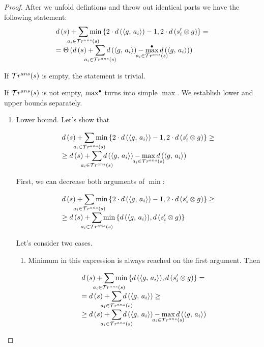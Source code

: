 \begin{proof}
After we unfold defintions and throw out identical parts we have the following statement:
\[ \begin{array}{l}
d\,(s) + \smashoperator[lr]{\sum\limits_{a_i \in \tra{s}}} \min\,\{2\cdot d\,(\taskst{g}{a_i}) - 1, 2\cdot d\,(s'_i \otimes g)\}  = \\
= \Theta\,(d\,(s) + \smashoperator[lr]{\sum\limits_{a_i \in \tra{s}}} d\,(\taskst{g}{a_i}) - \smashoperator{\maxd\limits_{a_i \in \tra{s}}} d\,(\taskst{g}{a_i})) \\
\end{array} \]

If $\mathcal{T}r^{ans}(s)$ is empty, the statement is trivial.

If $\mathcal{T}r^{ans}(s)$ is not empty, $\max^{\bullet}$ turns into simple $\max$. We establish lower and upper bounds separately.

\begin{enumerate}
  \item
  Lower bound. Let's show that 
  
  \[ \begin{array}{l}
  d\,(s) + \smashoperator[lr]{\sum\limits_{a_i \in \tra{s}}} \min\,\{2\cdot d\,(\taskst{g}{a_i}) - 1, 2\cdot d\,(s'_i \otimes g)\}  \ge \\
  \ge d\,(s) + \smashoperator[lr]{\sum\limits_{a_i \in \tra{s}}} d\,(\taskst{g}{a_i}) - \smashoperator{\max\limits_{a_i \in \tra{s}}} d\,(\taskst{g}{a_i}) \\
  \end{array} \]

  First, we can decrease both arguments of $\min$:

  \[ \begin{array}{l}
  d\,(s) + \smashoperator[lr]{\sum\limits_{a_i \in \tra{s}}} \min\,\{2\cdot d\,(\taskst{g}{a_i}) - 1, 2\cdot d\,(s'_i \otimes g)\}  \ge \\
  \ge d\,(s) + \smashoperator[lr]{\sum\limits_{a_i \in \tra{s}}} \min\,\{ d\,(\taskst{g}{a_i}), d\,(s'_i \otimes g)\} \\
  \end{array} \]

  Let's consider two cases.

  \begin{enumerate}
    \item Minimum in this expression is always reached on the first argument. Then
    
    \[ \begin{array}{l}
        d\,(s) + \smashoperator[lr]{\sum\limits_{a_i \in \tra{s}}} \min\,\{ d\,(\taskst{g}{a_i}), d\,(s'_i \otimes g)\} = \\
        = d\,(s) + \smashoperator[lr]{\sum\limits_{a_i \in \tra{s}}} d\,(\taskst{g}{a_i}) \ge \\
        \ge d\,(s) + \smashoperator[lr]{\sum\limits_{a_i \in \tra{s}}} d\,(\taskst{g}{a_i}) - \smashoperator{\max\limits_{a_i \in \tra{s}}} d\,(\taskst{g}{a_i}) \\
  \end{array} \]
  

\end{enumerate}
\end{enumerate}
\end{proof}
